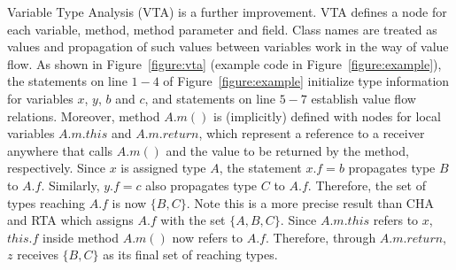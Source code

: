 \documentclass{fac}
\newcommand\set[1]{\{#1\}}
\begin{document}
Variable Type Analysis (VTA) is a further improvement. VTA defines a node for each variable, method, method parameter and field. Class names are treated as values and propagation of such values between variables work in the way of value flow.
As shown in Figure~\ref{figure:vta} (example code in Figure~\ref{figure:example}), the statements on line $1-4$ of Figure~\ref{figure:example} initialize type information for variables $x$, $y$, $b$ and $c$, and statements on line $5-7$ establish value flow relations. 
Moreover, method $A.m()$ is (implicitly) defined with nodes for local variables $A.m.this$ and $A.m.return$, which represent a reference to a receiver anywhere that calls $A.m()$ and the value to be returned by the method, respectively. 
Since $x$ is assigned type $A$, the statement $x.f=b$ propagates type $B$ to $A.f$. Similarly, $y.f=c$ also propagates type $C$ to $A.f$. Therefore, the set of types reaching $A.f$ is now $\set{B,C}$.
%
Note this is a more precise result than CHA and RTA which assigns $A.f$ with the set $\set{A,B,C}$.
Since $A.m.this$ refers to $x$, $this.f$ inside method $A.m()$ now refers to $A.f$. Therefore, through $A.m.return$, $z$ receives  $\set{B,C}$ as its final set of reaching types.
\end{document}
